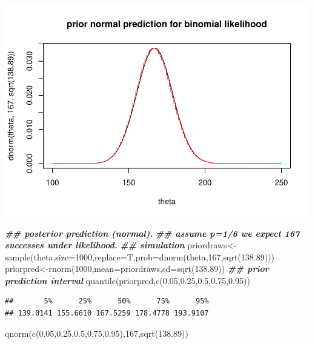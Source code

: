 \documentclass[
]{book}
\newenvironment{Shaded}{\begin{snugshade}}{\end{snugshade}}
\newcommand{\AttributeTok}[1]{\textcolor[rgb]{0.77,0.63,0.00}{#1}}
\newcommand{\DecValTok}[1]{\textcolor[rgb]{0.00,0.00,0.81}{#1}}
\newcommand{\DocumentationTok}[1]{\textcolor[rgb]{0.56,0.35,0.01}{\textbf{\textit{#1}}}}
\newcommand{\FloatTok}[1]{\textcolor[rgb]{0.00,0.00,0.81}{#1}}
\newcommand{\FunctionTok}[1]{\textcolor[rgb]{0.00,0.00,0.00}{#1}}
\newcommand{\NormalTok}[1]{#1}
\newcommand{\OtherTok}[1]{\textcolor[rgb]{0.56,0.35,0.01}{#1}}
\theoremstyle{definition}
\theoremstyle{definition}
\theoremstyle{definition}
\theoremstyle{definition}
\theoremstyle{remark}
\begin{document}
\includegraphics{_main_files/figure-latex/unnamed-chunk-13-1.pdf}

\begin{Shaded}
\begin{Highlighting}[]
  \DocumentationTok{\#\# posterior prediction (normal).}
     \DocumentationTok{\#\# assume p=1/6 we expect 167 successes under likelihood.}
\DocumentationTok{\#\# simulation     }
\NormalTok{     priordraws}\OtherTok{\textless{}{-}}\FunctionTok{sample}\NormalTok{(theta,}\AttributeTok{size=}\DecValTok{1000}\NormalTok{,}\AttributeTok{replace=}\NormalTok{T,}\AttributeTok{prob=}\FunctionTok{dnorm}\NormalTok{(theta,}\DecValTok{167}\NormalTok{,}\FunctionTok{sqrt}\NormalTok{(}\FloatTok{138.89}\NormalTok{)))}
\NormalTok{     priorpred}\OtherTok{\textless{}{-}}\FunctionTok{rnorm}\NormalTok{(}\DecValTok{1000}\NormalTok{,}\AttributeTok{mean=}\NormalTok{priordraws,}\AttributeTok{sd=}\FunctionTok{sqrt}\NormalTok{(}\FloatTok{138.89}\NormalTok{))}
     \DocumentationTok{\#\# prior prediction interval}
     \FunctionTok{quantile}\NormalTok{(priorpred,}\FunctionTok{c}\NormalTok{(}\FloatTok{0.05}\NormalTok{,}\FloatTok{0.25}\NormalTok{,}\FloatTok{0.5}\NormalTok{,}\FloatTok{0.75}\NormalTok{,}\FloatTok{0.95}\NormalTok{))}
\end{Highlighting}
\end{Shaded}

\begin{verbatim}
##       5%      25%      50%      75%      95% 
## 139.0141 155.6610 167.5259 178.4778 193.9107
\end{verbatim}

\begin{Shaded}
\begin{Highlighting}[]
     \FunctionTok{qnorm}\NormalTok{(}\FunctionTok{c}\NormalTok{(}\FloatTok{0.05}\NormalTok{,}\FloatTok{0.25}\NormalTok{,}\FloatTok{0.5}\NormalTok{,}\FloatTok{0.75}\NormalTok{,}\FloatTok{0.95}\NormalTok{),}\DecValTok{167}\NormalTok{,}\FunctionTok{sqrt}\NormalTok{(}\FloatTok{138.89}\NormalTok{))}
\end{Highlighting}
\end{Shaded}
\end{document}
